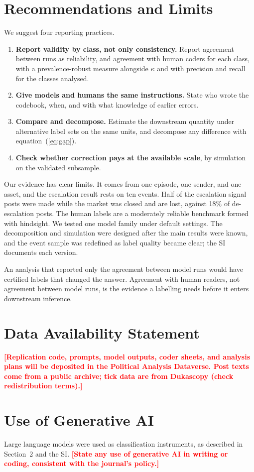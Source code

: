 \documentclass[12pt]{article}
\newcommand{\chk}[1]{\textcolor{red}{\textbf{[#1]}}}
\begin{document}
\section{Recommendations and Limits}

We suggest four reporting practices.

\begin{enumerate}
\item \textbf{Report validity by class, not only consistency.} Report agreement between runs as reliability, and agreement with human coders for each class, with a prevalence-robust measure alongside $\kappa$ and with precision and recall for the classes analysed.
\item \textbf{Give models and humans the same instructions.} State who wrote the codebook, when, and with what knowledge of earlier errors.
\item \textbf{Compare and decompose.} Estimate the downstream quantity under alternative label sets on the same units, and decompose any difference with equation~(\ref{eq:gap}).
\item \textbf{Check whether correction pays at the available scale}, by simulation on the validated subsample.
\end{enumerate}

Our evidence has clear limits. It comes from one episode, one sender, and one asset, and the escalation result rests on ten events. Half of the escalation signal posts were made while the market was closed and are lost, against 18\% of de-escalation posts. The human labels are a moderately reliable benchmark formed with hindsight. We tested one model family under default settings. The decomposition and simulation were designed after the main results were known, and the event sample was redefined as label quality became clear; the SI documents each version.

An analysis that reported only the agreement between model runs would have certified labels that changed the answer. Agreement with human readers, not agreement between model runs, is the evidence a labelling needs before it enters downstream inference.

\clearpage
\section*{Data Availability Statement}
\chk{Replication code, prompts, model outputs, coder sheets, and analysis plans will be deposited in the Political Analysis Dataverse. Post texts come from a public archive; tick data are from Dukascopy (check redistribution terms).}

\section*{Use of Generative AI}
Large language models were used as classification instruments, as described in Section~2 and the SI. \chk{State any use of generative AI in writing or coding, consistent with the journal's policy.}



\end{document}
